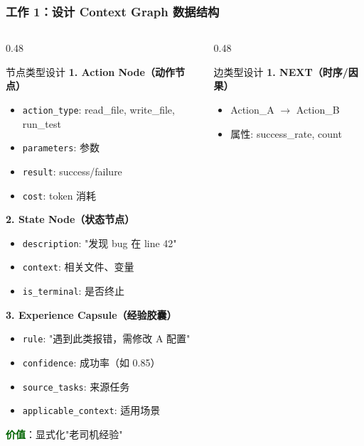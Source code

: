\documentclass[aspectratio=169,10pt]{beamer}
\begin{document}
\begin{frame}
  \frametitle{工作 1：设计 Context Graph 数据结构}

  \begin{columns}[T]
    \begin{column}{0.48\textwidth}
      \begin{block}{节点类型设计}
        \footnotesize
        \textbf{1. Action Node（动作节点）}
        \begin{itemize}
          \item \texttt{action\_type}: read\_file, write\_file, run\_test
          \item \texttt{parameters}: 参数
          \item \texttt{result}: success/failure
          \item \texttt{cost}: token 消耗
        \end{itemize}

        \vspace{0.15cm}

        \textbf{2. State Node（状态节点）}
        \begin{itemize}
          \item \texttt{description}: "发现 bug 在 line 42"
          \item \texttt{context}: 相关文件、变量
          \item \texttt{is\_terminal}: 是否终止
        \end{itemize}

        \vspace{0.15cm}

        \textbf{3. Experience Capsule（经验胶囊）}
        \begin{itemize}
          \item \texttt{rule}: "遇到此类报错，需修改 A 配置"
          \item \texttt{confidence}: 成功率（如 0.85）
          \item \texttt{source\_tasks}: 来源任务
          \item \texttt{applicable\_context}: 适用场景
        \end{itemize}
        \textcolor{darkgreen}{\small \textbf{价值}}：显式化"老司机经验"
      \end{block}
    \end{column}

    \begin{column}{0.48\textwidth}
      \begin{block}{边类型设计}
        \footnotesize
        \textbf{1. NEXT（时序/因果）}
        \begin{itemize}
          \item Action\_A $\rightarrow$ Action\_B
          \item 属性: success\_rate, count
        \end{itemize}


\end{block}
\end{column}
\end{columns}
\end{frame}
\end{document}
